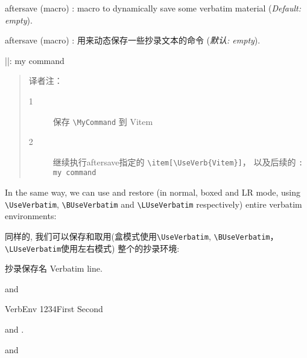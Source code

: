 \documentclass[twoside]{article}
\newcommand\cs[1]{\texttt{\textbackslash#1}}
\providecommand\optname[1]{\textsf{#1}}
\newenvironment{optlist}{\begin{description}%
  \renewcommand\makelabel[1]{%
    \descriptionlabel{\mdseries\optname{##1}}}%
  \itemsep0.25\itemsep}%
 {\end{description}}
\begin{document}
\begin{optlist}
  \item[aftersave (macro)]: macro to dynamically save some verbatim material
  (\emph{Default: empty}).
\end{optlist}

\begin{optlist}
  \item[aftersave (macro)]: 用来动态保存一些抄录文本的命令
  (\emph{默认: empty}).
\end{optlist}

\begin{SideBySideExample}
  \newcommand{\Vitem}{%
    }
  \DefineShortVerb{\|}
  \begin{description}
    \Vitem|\MyCommand|: my command
  \end{description}
\end{SideBySideExample}

\begin{quotation}
译者注：
\begin{description}
  \item[1] 保存 \verb|\MyCommand| 到 Vitem
  \item[2] 继续执行aftersave指定的 \verb|\item[\UseVerb{Vitem}]|， 以及后续的 \verb|: my command|
\end{description}
\end{quotation}

  In the same way, we can use and restore (in normal, boxed and LR mode,
using \cs{UseVerbatim}, \cs{BUseVerbatim} and \cs{LUseVerbatim} respectively)
entire verbatim environments:

  同样的, 我们可以保存和取用(盒模式使用\cs{UseVerbatim}, \cs{BUseVerbatim}，\cs{LUseVerbatim}使用左右模式)
整个的抄录环境:

\begin{SideBySideExample}
  \begin{SaveVerbatim}{抄录保存名}
    Verbatim line.
  \end{SaveVerbatim}
  and 
\end{SideBySideExample}

\begin{SideBySideExample}
  \begin{SaveVerbatim}[gobble=5]%
    {VerbEnv}
1234First
    Second
  \end{SaveVerbatim}

  and .

   and
\end{SideBySideExample}
\end{document}
